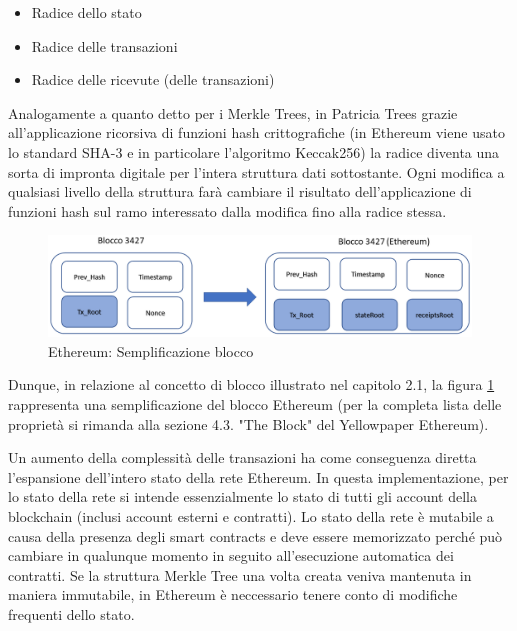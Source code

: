 \begin{itemize}
\item Radice dello stato
\item Radice delle transazioni
\item Radice delle ricevute (delle transazioni)
\end{itemize}

Analogamente a quanto detto per i Merkle Trees, in Patricia Trees grazie all'applicazione ricorsiva di funzioni hash crittografiche (in Ethereum viene usato lo standard SHA-3 e in particolare l'algoritmo Keccak256) la radice diventa una sorta di impronta digitale per l'intera struttura dati sottostante. Ogni modifica a qualsiasi livello della struttura farà cambiare il risultato dell'applicazione di funzioni hash sul ramo interessato dalla modifica fino alla radice stessa. 

\begin{figure}[H]
\centering
\includegraphics[width=1\textwidth]{immagini/EthBlockSimplified.png}
\caption{Ethereum: Semplificazione blocco}
\label{fig:BloccoEthereumSemplif}
\end{figure}

Dunque, in relazione al concetto di blocco illustrato nel capitolo 2.1, la figura \ref{fig:BloccoEthereumSemplif} rappresenta una semplificazione del blocco Ethereum (per la completa lista delle proprietà si rimanda alla sezione 4.3. "The Block" del Yellowpaper Ethereum).

Un aumento della complessità delle transazioni ha come conseguenza diretta l’espansione dell’intero stato della rete Ethereum. In questa implementazione, per lo stato della rete si intende essenzialmente lo stato di tutti gli account della blockchain (inclusi account esterni e contratti). Lo stato della rete è mutabile a causa della presenza degli smart contracts e deve essere memorizzato perché può cambiare in qualunque momento in seguito all’esecuzione automatica dei contratti. Se la struttura Merkle Tree una volta creata veniva mantenuta in maniera immutabile, in Ethereum è neccessario tenere conto di modifiche frequenti dello stato.

